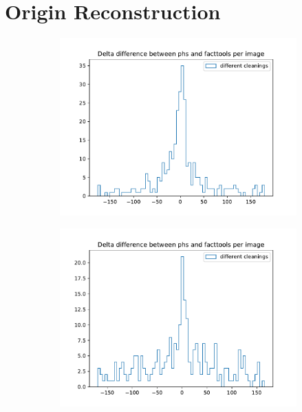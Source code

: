 \section{Origin Reconstruction}
%
\begin{figure}
  \begin{subfigure}{0.5\textwidth}
    \includegraphics[width=1.1\textwidth]{Plots/delta_diff_hist_DBSCAN_pe_20131104_162.pdf}
  \end{subfigure}
  \begin{subfigure}{0.5\textwidth}
    \includegraphics[width=1.1\textwidth]{Plots/delta_diff_hist_thresholds_pe_20131104_162.pdf}
  \end{subfigure}
  \begin{subfigure}{0.5\textwidth}

\end{subfigure}
\end{figure}
